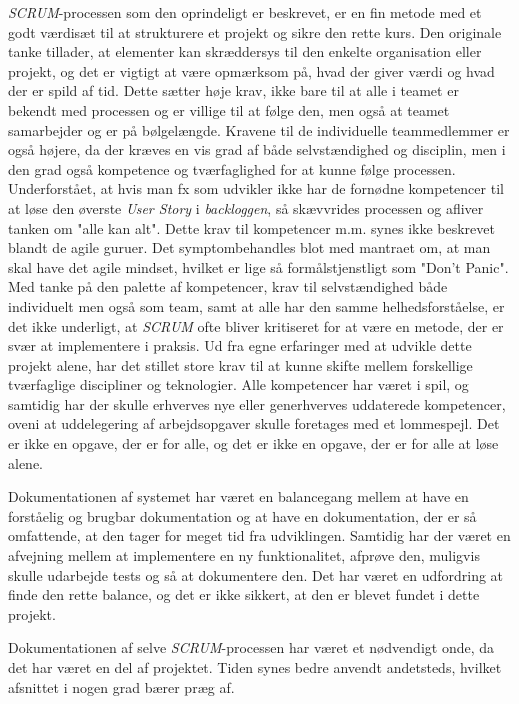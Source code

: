 \emph{SCRUM}-processen som den oprindeligt er beskrevet, er en fin metode med et godt værdisæt til at strukturere et projekt og sikre den rette kurs.
Den originale tanke tillader, at elementer kan skræddersys til den enkelte organisation eller projekt, og det er vigtigt at være opmærksom på, hvad der giver værdi og hvad der er spild af tid.
Dette sætter høje krav, ikke bare til at alle i teamet er bekendt med processen og er villige til at følge den, men også at teamet samarbejder og er på bølgelængde.
Kravene til de individuelle teammedlemmer er også højere, da der kræves en vis grad af både selvstændighed og disciplin, men i den grad også kompetence og tværfaglighed for at kunne følge processen.
Underforstået, at hvis man fx som udvikler ikke har de fornødne kompetencer til at løse den øverste \emph{User Story} i \emph{backloggen}, så skævvrides processen og afliver tanken om "alle kan alt". 
Dette krav til kompetencer m.m. synes ikke beskrevet blandt de agile guruer. Det symptombehandles blot med mantraet om, at man skal have det agile mindset, hvilket er lige så formålstjenstligt som "Don't Panic".
Med tanke på den palette af kompetencer, krav til selvstændighed både individuelt men også som team, samt at alle har den samme helhedsforståelse, er det ikke underligt, at \emph{SCRUM} ofte bliver kritiseret for at være en metode, der er svær at implementere i praksis.
Ud fra egne erfaringer med at udvikle dette projekt alene, har det stillet store krav til at kunne skifte mellem forskellige tværfaglige discipliner og teknologier. 
Alle kompetencer har været i spil, og samtidig har der skulle erhverves nye eller generhverves uddaterede kompetencer, oveni at uddelegering af arbejdsopgaver skulle foretages med et lommespejl.
Det er ikke en opgave, der er for alle, og det er ikke en opgave, der er for alle at løse alene.

Dokumentationen af systemet har været en balancegang mellem at have en forståelig og brugbar dokumentation og at have en dokumentation, der er så omfattende, at den tager for meget tid fra udviklingen.
Samtidig har der været en afvejning mellem at implementere en ny funktionalitet, afprøve den, muligvis skulle udarbejde tests og så at dokumentere den.
Det har været en udfordring at finde den rette balance, og det er ikke sikkert, at den er blevet fundet i dette projekt. 

Dokumentationen af selve \emph{SCRUM}-processen har været et nødvendigt onde, da det har været en del af projektet. Tiden synes bedre anvendt andetsteds, hvilket afsnittet i nogen grad bærer præg af.

